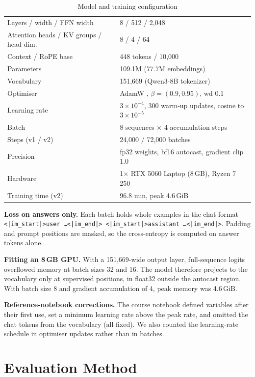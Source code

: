 \documentclass[conference]{IEEEtran}
\begin{document}
\begin{table}[t]
\caption{Model and training configuration}
\label{tab:arch}
\centering
\footnotesize
\begin{tabular}{@{}p{3.25cm}p{5.05cm}@{}}
\toprule
Layers / width / FFN width & 8 / 512 / 2{,}048 \\
Attention heads / KV groups / head dim. & 8 / 4 / 64 \\
Context / RoPE base & 448 tokens / 10{,}000 \\
Parameters & 109.1M (77.7M embeddings) \\
Vocabulary & 151{,}669 (Qwen3-8B tokenizer) \\
Optimiser & AdamW \cite{loshchilov2019adamw}, $\beta=(0.9, 0.95)$, wd 0.1 \\
Learning rate & $3\!\times\!10^{-4}$, 300 warm-up updates, cosine to $3\!\times\!10^{-5}$ \cite{loshchilov2017sgdr} \\
Batch & 8 sequences $\times$ 4 accumulation steps \\
Steps (v1 / v2) & 24{,}000 / 72{,}000 batches \\
Precision & fp32 weights, bf16 autocast, gradient clip 1.0 \\
Hardware & 1$\times$ RTX 5060 Laptop (8\,GB), Ryzen 7 250 \\
Training time (v2) & 96.8 min, peak 4.6\,GiB \\
\bottomrule
\end{tabular}
\end{table}

\textbf{Loss on answers only.} Each batch holds whole examples in the chat format
\texttt{<|im\_start|>user \ldots<|im\_end|> <|im\_start|>assistant \ldots<|im\_end|>}. Padding and prompt positions
are masked, so the cross-entropy is computed on answer tokens alone.

\textbf{Fitting an 8\,GB GPU.} With a 151{,}669-wide output layer, full-sequence logits overflowed memory at batch
sizes 32 and 16. The model therefore projects to the vocabulary only at supervised positions, in float32 outside the
autocast region. With batch size 8 and gradient accumulation of 4, peak memory was 4.6\,GiB.

\textbf{Reference-notebook corrections.} The course notebook defined variables after their first use, set a minimum
learning rate above the peak rate, and omitted the chat tokens from the vocabulary (all fixed). We also counted the
learning-rate schedule in optimiser updates rather than in batches.

\section{Evaluation Method}
\label{sec:eval}
\end{document}
